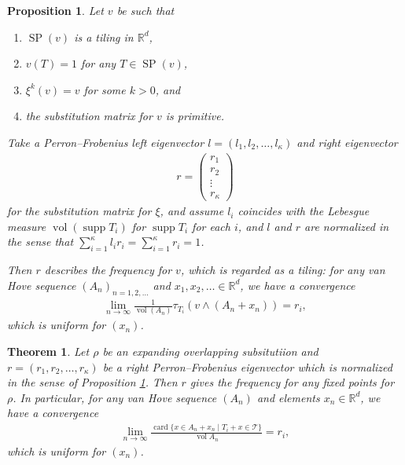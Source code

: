 \documentclass[10pt,a4paper]{amsart}
\newtheorem{prop}{Proposition}
\newtheorem{theorem}{Theorem}
\DeclareMathOperator{\SP}{SP}
\DeclareMathOperator{\card}{card}
\newcommand{\sci}{\wedge}
\DeclareMathOperator{\supp}{supp}
\DeclareMathOperator{\vol}{vol}
\begin{document}
\begin{prop}\label{prop_frequency_weighted-substi}
 Let $v$ be such that
\begin{enumerate}
\item $\SP(v)$ is a tiling in $\mathbb{R}^d$,
 \item $v(T)=1$ for any $T\in\SP(v)$,
\item $\xi^k(v)=v$ for some $k>0$, and
\item the substitution matrix for $v$ is primitive.
\end{enumerate}
Take a Perron--Frobenius left eigenvector $l=(l_1,l_2,\ldots ,l_{\kappa})$ and
right eigenvector
\begin{align*}
 r=
\begin{pmatrix}
 r_1\\r_2\\\vdots\\r_{\kappa}
\end{pmatrix}
\end{align*}
for the substitution matrix for $\xi$, 
and assume $l_i$ coincides with the Lebesgue measure $\vol(\supp T_i)$
for $\supp T_i$ for each $i$, and
$l$ and $r$ are normalized in the sense that $\sum_{i=1}^{\kappa}l_ir_i=\sum_{i=1}^{\kappa}r_i=1$.

Then $r$ describes the frequency for $v$, which is regarded as a tiling: for any van Hove sequence 
$(A_n)_{n=1,2,\ldots}$ and $x_1,x_2,\ldots\in\mathbb{R}^d$, we have a convergence
\begin{align*}
 \lim_{n\rightarrow \infty}\frac{1}{\vol(A_n)}\tau_{T_i}(v\sci (A_n+x_n))=r_i,
\end{align*}
which is uniform for $(x_n)$.
\end{prop}

\begin{theorem}\label{thm_uniform_tile_freq}
 Let $\rho$ be an expanding overlapping subsitutiion and $r=(r_1,r_2,\ldots, r_{\kappa})$ be
a right Perron--Frobenius eigenvector which is normalized in the sense of 
Proposition \ref{prop_frequency_weighted-substi}. Then $r$ gives the frequency for any fixed points for $\rho$.
In particular, for any van Hove sequence $(A_n)$ and elements $x_n\in\mathbb{R}^d$, we have
a convergence
\begin{align*}
      \lim_{n\rightarrow\infty}\frac{\card\{x\in A_n+x_n\mid T_i+x\in\mathcal{T}\}}{\vol{A_n}}=r_i,
\end{align*}
which is uniform for $(x_n)$.
\end{theorem}
\end{document}
